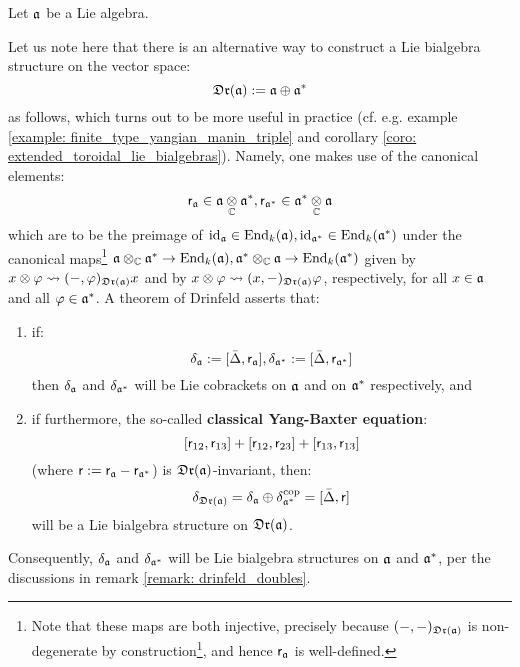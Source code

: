         \begin{remark} \label{remark: classical_R_matrices}
            Let $\a$ be a Lie algebra.
        
            Let us note here that there is an alternative way to construct a Lie bialgebra structure on the vector space:
                $$\mathfrak{Dr}(\mathfrak{a}) := \mathfrak{a} \oplus \mathfrak{a}^*$$
            as follows, which turns out to be more useful in practice (cf. e.g. example \ref{example: finite_type_yangian_manin_triple} and corollary \ref{coro: extended_toroidal_lie_bialgebras}). Namely, one makes use of the canonical elements:
                $$\sfr_{\a} \in \a \tensor_{\bbC} \a^*, \sfr_{\a^*} \in \a^* \tensor_{\bbC} \a$$
            which are to be the preimage of $\mathrm{id}_{\mathfrak{a}} \in \mathrm{End}_k(\mathfrak{a}), \mathrm{id}_{\mathfrak{a}^*} \in \mathrm{End}_k(\mathfrak{a}^*)$ under the canonical maps\footnote{Note that these maps are both injective, precisely because $(-, -)_{\mathfrak{Dr}(\mathfrak{a})}$ is non-degenerate by construction\footnote{Note that we are not making use of invariance here, and hence we do not need to assume that $\a$ is a Lie bialgebra from the start (this assumption is needed for the construction of the Lie bracket on $\frakDr(\a)$).}, and hence $\mathsf{r}_{\mathfrak{a}}$ is well-defined.} $\a \tensor_{\bbC} \a^* \to \End_k(\a), \a^* \tensor_{\bbC} \a \to \End_k(\a^*)$ given by $x \tensor \varphi \mapsto (-, \varphi)_{\frakDr(\a)} x$ and by $x \tensor \varphi \mapsto (x, -)_{\frakDr(\a)} \varphi$, respectively, for all $x \in \mathfrak{a}$ and all $\varphi \in \mathfrak{a}^*$. A theorem of Drinfeld asserts that:
            \begin{enumerate}
                \item if:
                    $$\delta_{\mathfrak{a}} := [\bar{\Delta}, \mathsf{r}_{\mathfrak{a}}], \delta_{\mathfrak{a}^*} := [\bar{\Delta}, \mathsf{r}_{\mathfrak{a}^*}]$$
                then $\delta_{\mathfrak{a}}$ and $\delta_{\mathfrak{a}^*}$ will be Lie cobrackets on $\a$ and on $\mathfrak{a}^*$ respectively, and
                \item if furthermore, the so-called \textbf{classical Yang-Baxter equation}:
                    $$[\mathsf{r}_{12}, \mathsf{r}_{13}] + [\mathsf{r}_{12}, \mathsf{r}_{23}] + [\mathsf{r}_{13}, \mathsf{r}_{13}]$$
                (where $\mathsf{r} := \mathsf{r}_{\mathfrak{a}} - \mathsf{r}_{\mathfrak{a}^*}$) is $\frakDr(\a)$-invariant, then:
                    $$\delta_{\mathfrak{Dr}(\mathfrak{a})} = \delta_{\mathfrak{a}} \oplus \delta_{\mathfrak{a}^*}^{\mathrm{cop}} = [\bar{\Delta}, \mathsf{r}]$$
                will be a Lie bialgebra structure on $\frakDr(\a)$.
            \end{enumerate}
            Consequently, $\delta_{\mathfrak{a}}$ and $\delta_{\mathfrak{a}^*}$ will be Lie bialgebra structures on $\a$ and $\mathfrak{a}^*$, per the discussions in remark \ref{remark: drinfeld_doubles}.
        \end{remark}
